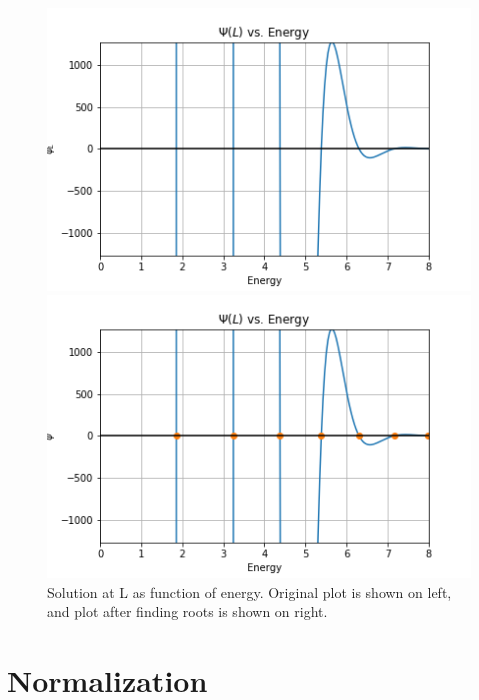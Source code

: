 \documentclass[12pt]{article}
\begin{document}
\begin{figure}[ht!]
	\centering
	\begin{minipage}[b]{0.4\textwidth}
		\includegraphics[scale=0.6]{../figures/psiAtL_EMax=8.png}
	\end{minipage}
	\hfill
	\begin{minipage}[b]{-- 0.4\textwidth}
		\includegraphics[scale=0.6]{../figures/rootsFound.png}
	\end{minipage}
	\caption{Solution at L as function of energy.  Original plot is shown on left, and plot after finding roots is shown on right.}
	\label{root}
\end{figure}

\section*{Normalization}
\end{document}
